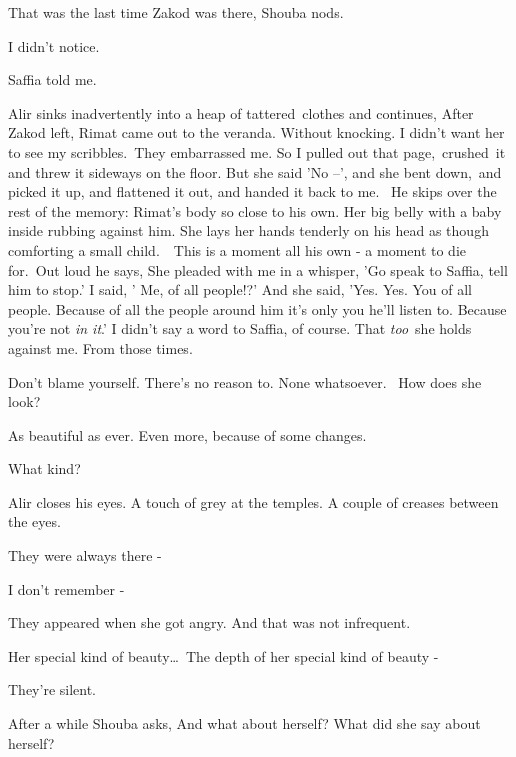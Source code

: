 \documentclass[twoside,11pt]{book}
\begin{document}
{\textquotedbl}That was the last time Zakod was there,{\textquotedbl} Shouba nods.

{\textquotedbl}I didn't notice.{\textquotedbl} 

{\textquotedbl}Saffia told me.{\textquotedbl}

Alir sinks inadvertently into a heap of tattered~clothes and continues, {\textquotedbl}After Zakod left, Rimat came out
to the veranda. Without knocking. I didn't want her to see my scribbles.\ They embarrassed me. So I pulled out that
page,\ crushed\ it and threw it sideways on the floor. But she said 'No --', and she bent down,\ and picked it up, and
flattened it out, and handed it back to me.{\textquotedbl}~ He skips over the rest of the memory: Rimat's body so close
to his own. Her big belly with a baby inside rubbing against him. She lays her hands tenderly on his head as though
comforting a small child.\ \ This is a moment all his own - a moment to die for.\ Out loud he says, {\textquotedbl}She
pleaded with me in a whisper, 'Go speak to Saffia, tell him to stop.' I said, ' Me, of all people!?' And she said,
'Yes. Yes. You of all people. Because of all the people around him it's only you he'll listen to. Because you're not
\textit{in it}.' I didn't say a word to Saffia, of course. That \textit{too}\ she holds against me. From those
times.{\textquotedbl} 

{\textquotedbl}Don't blame yourself. There's no reason to. None whatsoever.~ How does she look?{\textquotedbl} 

{\textquotedbl}As beautiful as ever. Even more, because of some changes.{\textquotedbl}

{\textquotedbl}What kind?{\textquotedbl} 

Alir closes his eyes. {\textquotedbl}A touch of grey at the temples. A couple of creases between the
eyes.{\textquotedbl} 

{\textquotedbl}They were always there -{\textquotedbl}~ 

{\textquotedbl}I don't remember -{\textquotedbl} 

{\textquotedbl}They appeared when she got angry. And that was not infrequent.{\textquotedbl} 

{\textquotedbl}Her special kind of beauty{\dots}\ The depth of her special kind of beauty -{\textquotedbl} 

They're silent.

After a while Shouba asks, {\textquotedbl}And what about herself? What did she say about herself?{\textquotedbl} 
\end{document}
